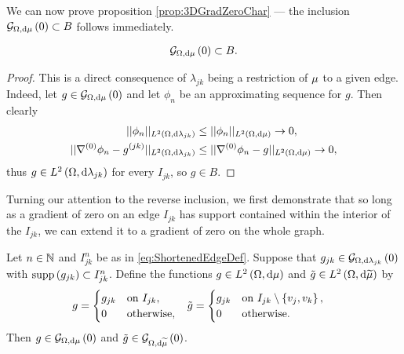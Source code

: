 We can now prove proposition \ref{prop:3DGradZeroChar} --- the inclusion $\mathcal{G}_{ \Omega, \mathrm{d}\mu}\left( 0 \right)\subset B$ follows immediately.
\begin{lemma} \label{lem:3DGradZeroSubsetB}
	\begin{align*}
		\mathcal{G}_{ \Omega, \mathrm{d}\mu}\left( 0 \right) \subset B.
	\end{align*}
\end{lemma}
\begin{proof}
	This is a direct consequence of $\lambda_{jk}$ being a restriction of $\mu$ to a given edge.
	Indeed, let $g\in\mathcal{G}_{ \Omega, \mathrm{d}\mu}\left( 0 \right)$ and let $\phi_n$ be an approximating sequence for $g$.
	Then clearly
	\begin{align*}
		\lvert\lvert \phi_n \rvert\rvert_{L^{2}\left( \Omega,\mathrm{d}\lambda_{jk} \right)} &\leq \lvert\lvert \phi_n \rvert\rvert_{L^{2}\left( \Omega,\mathrm{d}\mu \right)} \rightarrow 0, \\
		\lvert\lvert \nabla^{(0)}\phi_n - g^{(jk)} \rvert\rvert_{L^{2}\left( \Omega,\mathrm{d}\lambda_{jk} \right)} &\leq \lvert\lvert \nabla^{(0)}\phi_n - g \rvert\rvert_{L^{2}\left( \Omega,\mathrm{d}\mu \right)} \rightarrow 0,
	\end{align*}
	thus $g\in L^{2}\left( \Omega,\mathrm{d}\lambda_{jk} \right)$ for every $I_{jk}$, so $g\in B$.
\end{proof}
Turning our attention to the reverse inclusion, we first demonstrate that so long as a gradient of zero on an edge $I_{jk}$ has support contained within the interior of the $I_{jk}$, we can extend it to a gradient of zero on the whole graph.
\begin{lemma} \label{lem:3DExtensionLemmaGrads}
	Let $n\in\mathbb{N}$ and $I_{jk}^n$ be as in \eqref{eq:ShortenedEdgeDef}.
	Suppose that $g_{jk}\in\mathcal{G}_{ \Omega, \mathrm{d}\lambda_{jk}}\left( 0 \right)$ with $\mathrm{supp}\left( g_{jk} \right)\subset I_{jk}^n$.
	Define the functions $g\in L^{2}\left( \Omega,\mathrm{d}\mu \right)$ and $\tilde{g}\in L^{2}\left( \Omega,\mathrm{d}\widetilde{\mu} \right)$ by
	\begin{align*}
		g =	\begin{cases} g_{jk} & \mathrm{on} \ I_{jk}, \\ 0 & \mathrm{otherwise}, \end{cases} 
		&\quad
		\tilde{g} =	\begin{cases} g_{jk} & \mathrm{on} \ I_{jk}\setminus\clbracs{v_j,v_k}, \\ 0 & \mathrm{otherwise}. \end{cases}
	\end{align*}
	Then $g\in\mathcal{G}_{ \Omega, \mathrm{d}\mu}\left( 0 \right)$ and $\tilde{g}\in\mathcal{G}_{ \Omega, \mathrm{d}\widetilde{\mu}}\left( 0 \right)$.
\end{lemma}
